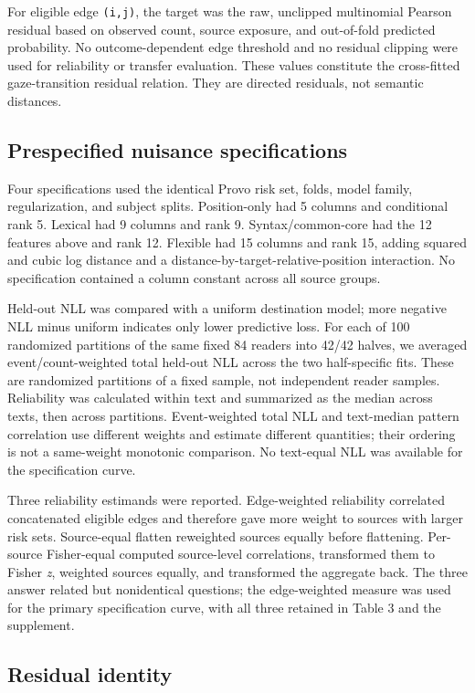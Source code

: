 \documentclass[11pt]{article}
\begin{document}
For eligible edge \texttt{(i,j)}, the target was the raw, unclipped multinomial Pearson residual based on observed count, source exposure, and out-of-fold predicted probability. No outcome-dependent edge threshold and no residual clipping were used for reliability or transfer evaluation. These values constitute the cross-fitted gaze-transition residual relation. They are directed residuals, not semantic distances.

\subsection{Prespecified nuisance specifications}

Four specifications used the identical Provo risk set, folds, model family, regularization, and subject splits. Position-only had 5 columns and conditional rank 5. Lexical had 9 columns and rank 9. Syntax/common-core had the 12 features above and rank 12. Flexible had 15 columns and rank 15, adding squared and cubic log distance and a distance-by-target-relative-position interaction. No specification contained a column constant across all source groups.

Held-out NLL was compared with a uniform destination model; more negative NLL minus uniform indicates only lower predictive loss. For each of 100 randomized partitions of the same fixed 84 readers into 42/42 halves, we averaged event/count-weighted total held-out NLL across the two half-specific fits. These are randomized partitions of a fixed sample, not independent reader samples. Reliability was calculated within text and summarized as the median across texts, then across partitions. Event-weighted total NLL and text-median pattern correlation use different weights and estimate different quantities; their ordering is not a same-weight monotonic comparison. No text-equal NLL was available for the specification curve.

Three reliability estimands were reported. Edge-weighted reliability correlated concatenated eligible edges and therefore gave more weight to sources with larger risk sets. Source-equal flatten reweighted sources equally before flattening. Per-source Fisher-equal computed source-level correlations, transformed them to Fisher \emph{z}, weighted sources equally, and transformed the aggregate back. The three answer related but nonidentical questions; the edge-weighted measure was used for the primary specification curve, with all three retained in Table 3 and the supplement.

\subsection{Residual identity}
\end{document}
